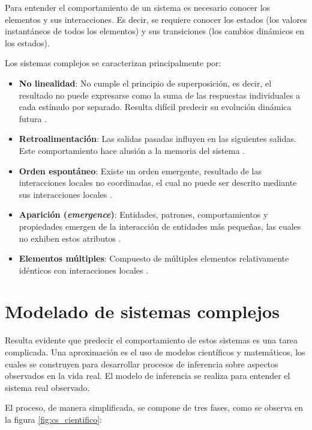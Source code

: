 Para entender el comportamiento de un sistema es necesario conocer los elementos y sus interacciones. Es decir, se requiere conocer los estados (los valores instantáneos de todos los elementos) y sus transiciones (los cambios dinámicos en los estados).

Los sistemas complejos se caracterizan principalmente por:

\begin{itemize}
	
	\item \textbf{No linealidad}: No cumple el principio de superposición, es decir, el resultado no puede expresarse como la suma de las respuestas individuales a cada estímulo por separado. Resulta difícil predecir su evolución dinámica futura \cite{Zelinka2018_cs, Moriello2003_cs}.

	\item \textbf{Retroalimentación}: Las salidas pasadas influyen en las siguientes salidas. Este comportamiento hace alusión a la memoria del sistema \cite{Moriello2003_cs}. 
	
	\item \textbf{Orden espontáneo}: Existe un orden emergente, resultado de las interacciones locales no coordinadas, el cual no puede ser descrito mediante sus interacciones locales \cite{Moriello2003_cs}.
	
	\item \textbf{Aparición (\textit{emergence})}: Entidades, patrones, comportamientos y propiedades emergen de la interacción de entidades más pequeñas, las cuales no exhiben estos atributos \cite{Moriello2003_cs}.
	
	\item \textbf{Elementos múltiples}: Compuesto de múltiples elementos relativamente idénticos con interacciones locales \cite{Zelinka2018_cs}. 
\end{itemize}

\section{Modelado de sistemas complejos}

Resulta evidente que predecir el comportamiento de estos sistemas es una tarea complicada. Una aproximación es el uso de modelos científicos y matemáticos, los cuales se construyen para desarrollar procesos de inferencia sobre aspectos observados en la vida real. El modelo de inferencia se realiza para entender el sistema real observado.

El proceso, de manera simplificada, se compone de tres fases, como se observa en la figura \ref{fig:cs_cientifico}:

